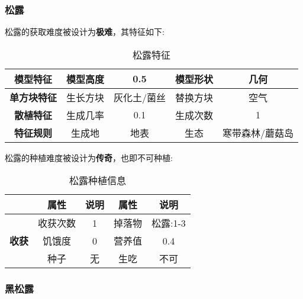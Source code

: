 \subsubsection{松露}

松露的获取难度被设计为\textbf{极难}，其特征如下:
\begin{table}[H]
    \centering
    \caption{松露特征}
    \label{table:松露特征}
    \setlength{\tabcolsep}{4mm}
    \begin{tabular}{c|cc|cc}
        \toprule
        \textbf{模型特征}   & 模型高度 & 0.5      & 模型形状 & 几何     \\
        \midrule
        \textbf{单方块特征} & 生长方块 & 灰化土/菌丝 & 替换方块 & 空气     \\
        \midrule
        \textbf{散植特征}   & 生成几率 & 0.1   & 生成次数 & 1        \\
        \midrule
        \textbf{特征规则}   & 生成地   & 地表   & 生态     & 寒带森林/蘑菇岛 \\
        \bottomrule
    \end{tabular}
\end{table}


松露的种植难度被设计为\textbf{传奇}，也即不可种植:

\begin{table}[H]
    \centering
    \caption{松露种植信息}
    \label{table:松露种植信息}
    \setlength{\tabcolsep}{4mm}
    \begin{tabular}{c|cc|cc}
        \toprule
                                           & \textbf{属性} & \textbf{说明} & \textbf{属性} & \textbf{说明} \\
        \midrule
        \multirow{3}{*}{\textbf{收获}}     & 收获次数      & 1             & 掉落物        & 松露:1-3      \\
                                           & 饥饿度        & 0             & 营养值        & 0.4           \\
                                           & 种子          & 无  & 生吃          & 不可   \\
        \bottomrule
    \end{tabular}
\end{table}

\subsubsection{黑松露}

